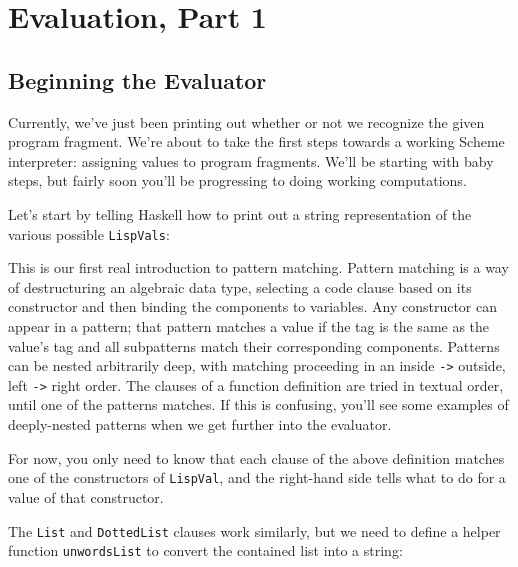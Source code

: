 \chapter{Evaluation, Part 1}
 
 
\section{Beginning the Evaluator}
 
Currently, we've just been printing out whether or not we recognize the given program fragment. We're about to take the first steps towards a working Scheme interpreter: assigning values to program fragments. We'll be starting with baby steps, but fairly soon you'll be progressing to doing working computations.
 
Let's start by telling Haskell how to print out a string representation of the various possible \verb|LispVals|:
 
 
This is our first real introduction to pattern matching. Pattern matching is a way of destructuring an algebraic data type, selecting a code clause based on its constructor and then binding the components to variables. Any constructor can appear in a pattern; that pattern matches a value if the tag is the same as the value's tag and all subpatterns match their corresponding components. Patterns can be nested arbitrarily deep, with matching proceeding in an inside \lstinline|->| outside, left \lstinline|->| right order. The clauses of a function definition are tried in textual order, until one of the patterns matches. If this is confusing, you'll see some examples of deeply-nested patterns when we get further into the evaluator.
 
For now, you only need to know that each clause of the above definition matches one of the constructors of \verb|LispVal|, and the right-hand side tells what to do for a value of that constructor.
 
The \verb|List| and \verb|DottedList| clauses work similarly, but we need to define a helper function \verb|unwordsList| to convert the contained list into a string:
 
 
